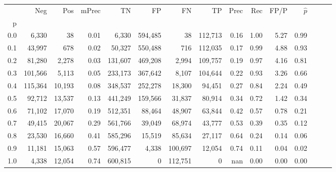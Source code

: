 \begin{tabular}{rrrrrrrrrrrrrrr}
\toprule
{} &      Neg &     Pos & mPrec &       TN &       FP &       FN &       TP &  Prec &   Rec &  FP/P & $\hat{p}$ \\
p   &          &         &       &          &          &          &          &       &       &       &           \\
\midrule
0.0 &    6,330 &      38 &  0.01 &    6,330 &  594,485 &       38 &  112,713 &  0.16 &  1.00 &  5.27 &      0.99 \\
0.1 &   43,997 &     678 &  0.02 &   50,327 &  550,488 &      716 &  112,035 &  0.17 &  0.99 &  4.88 &      0.93 \\
0.2 &   81,280 &   2,278 &  0.03 &  131,607 &  469,208 &    2,994 &  109,757 &  0.19 &  0.97 &  4.16 &      0.81 \\
0.3 &  101,566 &   5,113 &  0.05 &  233,173 &  367,642 &    8,107 &  104,644 &  0.22 &  0.93 &  3.26 &      0.66 \\
0.4 &  115,364 &  10,193 &  0.08 &  348,537 &  252,278 &   18,300 &   94,451 &  0.27 &  0.84 &  2.24 &      0.49 \\
0.5 &   92,712 &  13,537 &  0.13 &  441,249 &  159,566 &   31,837 &   80,914 &  0.34 &  0.72 &  1.42 &      0.34 \\
0.6 &   71,102 &  17,070 &  0.19 &  512,351 &   88,464 &   48,907 &   63,844 &  0.42 &  0.57 &  0.78 &      0.21 \\
0.7 &   49,415 &  20,067 &  0.29 &  561,766 &   39,049 &   68,974 &   43,777 &  0.53 &  0.39 &  0.35 &      0.12 \\
0.8 &   23,530 &  16,660 &  0.41 &  585,296 &   15,519 &   85,634 &   27,117 &  0.64 &  0.24 &  0.14 &      0.06 \\
0.9 &   11,181 &  15,063 &  0.57 &  596,477 &    4,338 &  100,697 &   12,054 &  0.74 &  0.11 &  0.04 &      0.02 \\
1.0 &    4,338 &  12,054 &  0.74 &  600,815 &        0 &  112,751 &        0 &   nan &  0.00 &  0.00 &      0.00 \\
\bottomrule
\end{tabular}
